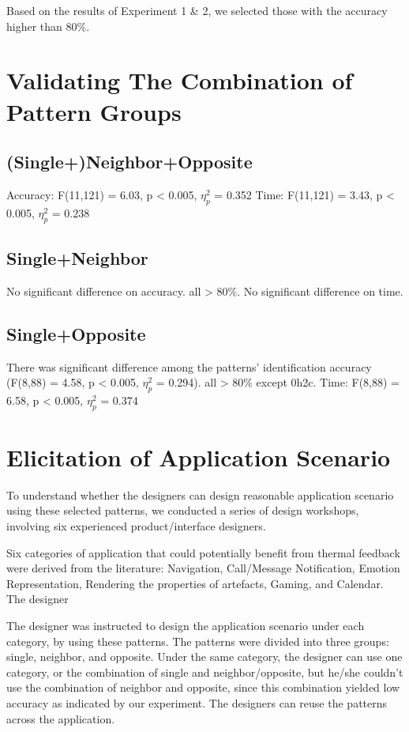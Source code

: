 \documentclass[preprint,12pt]{elsarticle}
\begin{document}
Based on the results of Experiment 1 \& 2, we selected those with the accuracy higher than 80\%.

\section{Validating The Combination of Pattern Groups}
\subsection{(Single+)Neighbor+Opposite}
Accuracy: F(11,121) = 6.03, p < 0.005, $\eta_p^2$ = 0.352
Time: F(11,121) = 3.43, p < 0.005, $\eta_p^2$ = 0.238

\subsection{Single+Neighbor}
No significant difference on accuracy. all > 80\%.
No significant difference on time.

\subsection{Single+Opposite}
There was significant difference among the patterns' identification accuracy (F(8,88) = 4.58, p < 0.005, $\eta_p^2$ = 0.294). all > 80\% except 0h2c.
Time: F(8,88) = 6.58, p < 0.005, $\eta_p^2$ = 0.374

\section{Elicitation of Application Scenario}
To understand whether the designers can design reasonable application scenario using these selected patterns, we conducted a series of design workshops, involving six experienced product/interface designers.

Six categories of application that could potentially benefit from thermal feedback were derived from the literature: Navigation, Call/Message Notification, Emotion Representation, Rendering the properties of artefacts, Gaming, and Calendar. The designer

The designer was instructed to design the application scenario under each category, by using these patterns. The patterns were divided into three groups: single, neighbor, and opposite. Under the same category, the designer can use one category, or the combination of single and neighbor/opposite, but he/she couldn't use the combination of neighbor and opposite, since this combination yielded low accuracy as indicated by our experiment. The designers can reuse the patterns across the application.
\end{document}
